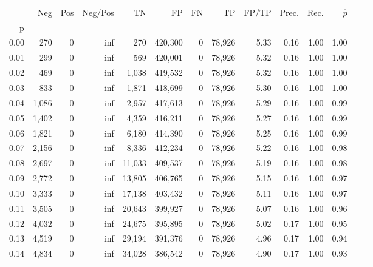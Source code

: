\begin{tabular}{rrrrrrrrrrrrrr}
\toprule
{} &    Neg &    Pos &  Neg/Pos &       TN &       FP &      FN &      TP & FP/TP & Prec. &  Rec. & $\hat{p}$ \\
p    &        &        &          &          &          &         &         &       &       &       &           \\
\midrule
0.00 &    270 &      0 &      inf &      270 &  420,300 &       0 &  78,926 &  5.33 &  0.16 &  1.00 &      1.00 \\
0.01 &    299 &      0 &      inf &      569 &  420,001 &       0 &  78,926 &  5.32 &  0.16 &  1.00 &      1.00 \\
0.02 &    469 &      0 &      inf &    1,038 &  419,532 &       0 &  78,926 &  5.32 &  0.16 &  1.00 &      1.00 \\
0.03 &    833 &      0 &      inf &    1,871 &  418,699 &       0 &  78,926 &  5.30 &  0.16 &  1.00 &      1.00 \\
0.04 &  1,086 &      0 &      inf &    2,957 &  417,613 &       0 &  78,926 &  5.29 &  0.16 &  1.00 &      0.99 \\
0.05 &  1,402 &      0 &      inf &    4,359 &  416,211 &       0 &  78,926 &  5.27 &  0.16 &  1.00 &      0.99 \\
0.06 &  1,821 &      0 &      inf &    6,180 &  414,390 &       0 &  78,926 &  5.25 &  0.16 &  1.00 &      0.99 \\
0.07 &  2,156 &      0 &      inf &    8,336 &  412,234 &       0 &  78,926 &  5.22 &  0.16 &  1.00 &      0.98 \\
0.08 &  2,697 &      0 &      inf &   11,033 &  409,537 &       0 &  78,926 &  5.19 &  0.16 &  1.00 &      0.98 \\
0.09 &  2,772 &      0 &      inf &   13,805 &  406,765 &       0 &  78,926 &  5.15 &  0.16 &  1.00 &      0.97 \\
0.10 &  3,333 &      0 &      inf &   17,138 &  403,432 &       0 &  78,926 &  5.11 &  0.16 &  1.00 &      0.97 \\
0.11 &  3,505 &      0 &      inf &   20,643 &  399,927 &       0 &  78,926 &  5.07 &  0.16 &  1.00 &      0.96 \\
0.12 &  4,032 &      0 &      inf &   24,675 &  395,895 &       0 &  78,926 &  5.02 &  0.17 &  1.00 &      0.95 \\
0.13 &  4,519 &      0 &      inf &   29,194 &  391,376 &       0 &  78,926 &  4.96 &  0.17 &  1.00 &      0.94 \\
0.14 &  4,834 &      0 &      inf &   34,028 &  386,542 &       0 &  78,926 &  4.90 &  0.17 &  1.00 &      0.93 \\

\end{tabular}
